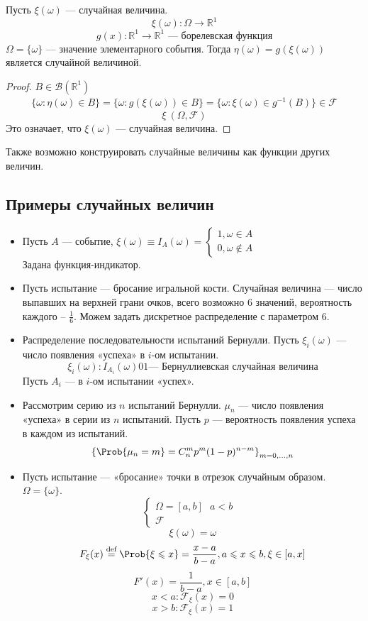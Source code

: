 \begin{theorem}
	Пусть $\xi (\omega)$ --- случайная величина.
	\[
		\xi (\omega) : \Omega \rightarrow \mathbb{R}^1
	\]
	\[
		g(x) : \mathbb{R}^1 \rightarrow \mathbb{R}^1 \text{ --- борелевская функция}
	\]
	$\Omega = \{ \omega \}$ --- значение элементарного события. Тогда $\eta (\omega) = g (\xi (\omega))$ является случайной величиной.
\end{theorem}
\begin{proof}
	$B \in \mathcal{B} (\mathbb{R}^1)$
	\[
		\begin{split}
			\{ \omega : \eta (\omega) \in B \} = \{ \omega : g(\xi(\omega)) \in B \} = \{ \omega : \xi(\omega) \in g^{-1} (B) \} \in \mathcal {F}
		\end{split}
	\]
	\[
		\xi ~ (\Omega, \mathcal{F})
	\]
	Это означает, что $\xi(\omega)$ --- случайная величина.
\end{proof}
Также возможно конструировать случайные величины как функции других величин.
\subsection{Примеры случайных величин}
\begin{itemize}
	\item Пусть $A$ --- событие, $\xi(\omega) \equiv I_A (\omega) = \begin{cases}
		1, \omega \in A \\
		0, \omega \not \in A
	\end{cases} $ \\
	Задана функция-индикатор.
	\item Пусть испытание --- бросание игральной кости. Случайная величина --- число выпавших на верхней грани очков, всего возможно 6 значений, вероятность каждого -- $\frac{1}{6}$. Можем задать дискретное распределение с параметром 6.
	\item Распределение последовательности испытаний Бернулли. Пусть $\xi_i (\omega)$ --- число появления «успеха» в $i$-ом испытании.
	\[
		\xi_i (\omega) : I_{A_i} (\omega) 0 1 \text{--- Бернуллиевская случайная величина}
	\]
	Пусть $A_i$ --- в $i$-ом испытании «успех».
	\item Рассмотрим серию из $n$ испытаний Бернулли. $\mu_n$ --- число появления «успеха» в серии из $n$ испытаний. Пусть $p$ --- вероятность появления успеха в каждом из испытаний.
	\[
		{\{ \Prob \{ \mu_n = m \} = C_n^m p^m (1-p)^{n-m} \}}_{m = 0, \ldots, n}
	\]
	\item Пусть испытание --- «бросание» точки в отрезок случайным образом. $\Omega = \{ \omega \}$.
	\[
		\begin{cases}
			\Omega = [a, b] \text{ $a < b$ } \\
			\mathcal{F}
		\end{cases}
	\]
	\[
		\xi (\omega) = \omega
	\]
	\[
		F_\xi (x) \overset{\textrm{def}}{=} \Prob \{ \xi \leqslant x \} = \frac{x - a}{b - a}, a \leqslant x \leqslant b, \xi \in [a, x]
	\]
	\[
		F' (x) = \frac{1}{b-a}, x \in [a, b]
	\]
	\[
		x < a : \mathcal{F}_\xi (x) = 0
	\]
	\[
		x > b : \mathcal{F}_\xi (x) = 1
	\]
\end{itemize}
\setcounter{equation}{0}
